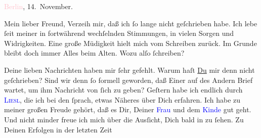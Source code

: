 \pstart
           \textcolor{pink}{Berlin}{}\ledrightnote{\textcolor{pink}{Berlin}}, 14. November.\pend
           
\pstart\center{}Mein lieber Freund,\pend
\pstart
           Verzeih mir, daß ich ſo lange nicht geſchrieben habe. Ich lebe ſeit meiner \label{K_L03388-1v}\label{K_L03388-1h} in fortwährend wechſelnden Stimmungen, in vielen Sorgen und Widrigkeiten.
               Eine große Müdigkeit hielt mich vom Schreiben zurück. Im Grunde  bleibt doch immer Alles beim
               Alten. Wozu alſo ſchreiben?\pend
           
\pstart
           Deine lieben Nachrichten haben mir ſehr gefehlt. Warum haſt \uline{Du} mir denn nicht geſchrieben? Sind wir denn ſo formell geworden, daß
               Einer auf des Andern Brief wartet, um ihm Nachricht von ſich zu geben? Geſtern{ }{\pb}habe ich endlich durch \textsc{\textcolor{blue}{Liesl}{}\ledrightnote{\textcolor{blue}{Elisabeth Steinrück}}}, die ich bei den \label{K_L03388-2v}\label{K_L03388-2h} ſprach, etwas Näheres über Dich
               erfahren. Ich habe zu meiner großen Freude gehört, daß es Dir, Deiner \textcolor{blue}{Frau}{}\ledrightnote{{$\rightarrow$}\textcolor{blue}{Olga Schnitzler}} und dem \textcolor{blue}{Kinde}{}\ledrightnote{{$\rightarrow$}\textcolor{blue}{Heinrich Schnitzler}} gut geht. Und nicht minder freue ich
               mich über die Ausſicht, Dich bald in \label{K_L03388-3v}\label{K_L03388-3h} zu ſehen. Zu Deinen Erfolgen in der letzten Zeit
